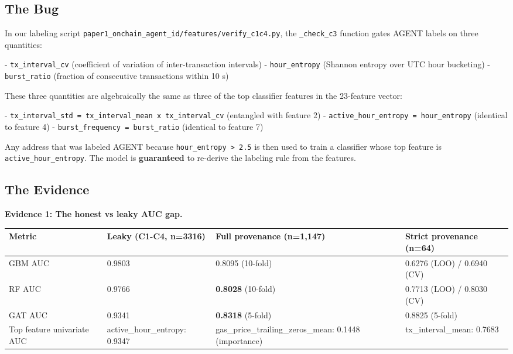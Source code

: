\documentclass[sigconf,nonacm=false]{acmart}
\begin{document}
\subsection{The Bug}

In our labeling script \texttt{paper1\_onchain\_agent\_id/features/verify\_c1c4.py}, the \texttt{\_check\_c3} function gates AGENT labels on three quantities:

- \texttt{tx\_interval\_cv} (coefficient of variation of inter-transaction intervals)
- \texttt{hour\_entropy} (Shannon entropy over UTC hour bucketing)
- \texttt{burst\_ratio} (fraction of consecutive transactions within 10 s)

These three quantities are algebraically the same as three of the top classifier features in the 23-feature vector:

- \texttt{tx\_interval\_std = tx\_interval\_mean x tx\_interval\_cv} (entangled with feature 2)
- \texttt{active\_hour\_entropy = hour\_entropy} (identical to feature 4)
- \texttt{burst\_frequency = burst\_ratio} (identical to feature 7)

Any address that was labeled AGENT because \texttt{hour\_entropy > 2.5} is then used to train a classifier whose top feature is \texttt{active\_hour\_entropy}. The model is \textbf{guaranteed} to re-derive the labeling rule from the features.

\subsection{The Evidence}

\textbf{Evidence 1: The honest vs leaky AUC gap.}

\begin{table}[h]
\centering
\small
\begin{tabular}{llll}
\toprule
Metric & Leaky (C1-C4, n=3316) & Full provenance (n=1,147) & Strict provenance (n=64) \\
\midrule
GBM AUC & 0.9803 & 0.8095 (10-fold) & 0.6276 (LOO) / 0.6940 (CV) \\
RF AUC & 0.9766 & \textbf{0.8028} (10-fold) & 0.7713 (LOO) / 0.8030 (CV) \\
GAT AUC & 0.9341 & \textbf{0.8318} (5-fold) & 0.8825 (5-fold) \\
Top feature univariate AUC & active\_hour\_entropy: 0.9347 & gas\_price\_trailing\_zeros\_mean: 0.1448 (importance) & tx\_interval\_mean: 0.7683 \\
\bottomrule
\end{tabular}
\end{table}
\end{document}
